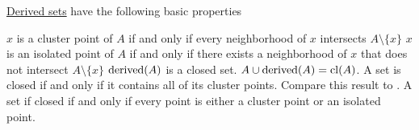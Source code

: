 \begin{proposition}\label{thm:derived_set_properties}
  \hyperref[def:topological_derived_set]{Derived sets} have the following basic properties
  \begin{PropEnum}
     \( x \) is a cluster point of \( A \) if and only if every neighborhood of \( x \) intersects \( A \setminus \{ x \} \)
     \( x \) is an isolated point of \( A \) if and only if there exists a neighborhood of \( x \) that does not intersect \( A \setminus \{ x \} \)
     \( \operatorname{derived}(A) \) is a closed set.
     \( A \cup \operatorname{derived}(A) = \operatorname{cl}(A) \).
     A set is closed if and only if it contains all of its cluster points. Compare this result to .
     A set if closed if and only if every point is either a cluster point or an isolated point.
  \end{PropEnum}
\end{proposition}
